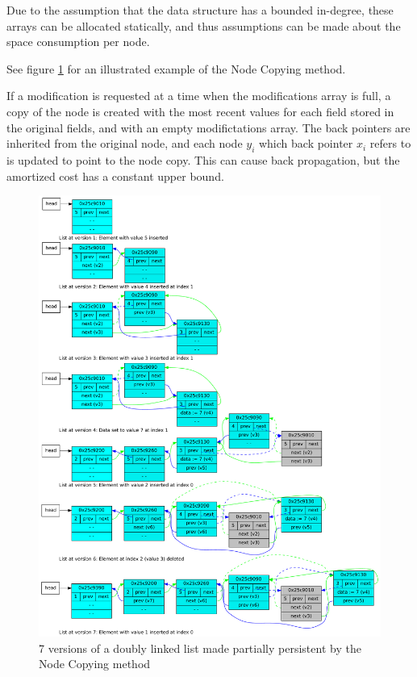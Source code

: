 Due to the assumption that the data structure has a bounded in-degree, these
arrays can be allocated statically, and thus assumptions can be made about the
space consumption per node.

See figure \ref{fig:pp-7-versions.pdf} for an illustrated example of the Node
Copying method.

If a modification is requested at a time when the modifications array is full, a
copy of the node is created with the most recent values for each field stored in
the original fields, and with an empty modifictations array. The back pointers
are inherited from the original node, and each node $y_i$ which back pointer
$x_i$ refers to is updated to point to the node copy. This can cause back
propagation, but the amortized cost has a constant upper bound.


\begin{figure}[!hbp]
    \includegraphics[width=\textwidth]{figures/pp-7-versions.pdf}
    \caption{7 versions of a doubly linked list made  partially persistent by
    the Node Copying method}
    \label{fig:pp-7-versions.pdf}
\end{figure}